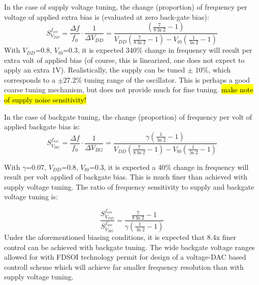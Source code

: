 		In the case of supply voltage tuning, the change (proportion) of frequency per voltage of applied extra bias is (evaluated at zero back-gate bias):
		\begin{equation}
			S^{f_{osc}}_{V_{DD}} = \frac{\Delta f}{f_0}\cdot\frac{1}{\Delta V_{DD}}  = \frac{\left(\frac{7}{8\ln2}-1\right)}{V_{DD}\left(\frac{7}{8\ln2}-1\right)-V_{t0}\left(\frac{1}{\ln2}-1\right)}
		\end{equation}
		With $V_{DD}$=0.8, $V_{t0}$=0.3, it is expected 340\% change in frequency will result per extra volt of applied bias (of course, this is linearized, one does not expect to apply an extra 1V). Realistically, the supply can be tuned $\pm$ 10\%, which corresponds to a $\pm$27.2\% tuning range of the oscillator. This is perhaps a good coarse tuning mechanism, but does not provide much for fine tuning. \hl{make note of supply noise sensitivity!}

		\par In the case of backgate tuning, the change (proportion) of frequency per volt of applied backgate bias is:
		\begin{equation}
			S^{f_{osc}}_{V_{BG}} = \frac{\Delta f}{f_0}\cdot\frac{1}{\Delta V_{BG}}  = \frac{\gamma \left(\frac{1}{\ln2}-1\right)}{V_{DD}\left(\frac{7}{8\ln2}-1\right)-V_{t0}\left(\frac{1}{\ln2}-1\right)}
		\end{equation}

		With $\gamma$=0.07, $V_{DD}$=0.8, $V_{t0}$=0.3, it is expected a 40\% change in frequency will result per volt applied of backgate bias. This is much finer than achieved with supply voltage tuning. The ratio of frequency sensitivity to supply and backgate voltage tuning is:

		\begin{equation}
			\frac{S^{f_{osc}}_{V_{DD}}}{S^{f_{osc}}_{V_{BG}}} =  \frac{\frac{7}{8\ln2}-1}{\gamma \left(\frac{1}{\ln2}-1\right)}
		\end{equation}
		Under the aforementioned biasing conditions, it is expected that 8.4x finer control can be achieved with backgate tuning. The wide backgate voltage ranges allowed for with FDSOI technology permit for design of a voltage-DAC based controll scheme which will achieve far smaller frequency resolution than with supply voltage tuning. 


